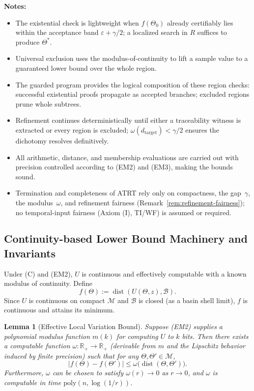 \documentclass[12pt]{article}
\theoremstyle{definition}
\theoremstyle{plain}
\newtheorem{lemma}{Lemma}[section]
\begin{document}
\textbf{Notes:}
\begin{itemize}[itemsep=1pt]
  \item The existential check is lightweight when \(f(\Theta_0)\) already certifiably lies within the acceptance band \(\varepsilon + \gamma/2\); a localized search in \(R\) suffices to produce \(\Theta^*\).  
  \item Universal exclusion uses the modulus-of-continuity to lift a sample value to a guaranteed lower bound over the whole region.  
    \item The guarded program provides the logical composition of these region checks: successful existential proofs propagate as accepted branches; excluded regions prune whole subtrees.  
  \item Refinement continues deterministically until either a traceability witness is extracted or every region is excluded; \(\omega(d_{\mathrm{target}})<\gamma/2\) ensures the dichotomy resolves definitively.  
  \item All arithmetic, distance, and membership evaluations are carried out with precision controlled according to (EM2) and (EM3), making the bounds sound.  
  \item Termination and completeness of ATRT rely only on compactness, the gap~$\gamma$, the modulus~$\omega$, and refinement fairness (Remark~\ref{rem:refinement-fairness}); no temporal-input fairness (Axiom (I), TI/WF) is assumed or required.

\end{itemize}


\subsection{Continuity-based Lower Bound Machinery and Invariants}

Under (C) and (EM2), \(U\) is continuous and effectively computable with a known modulus of continuity. Define
\[
f(\Theta) := \operatorname{dist}(U(\Theta,z), \mathcal B).
\]
Since \(U\) is continuous on compact \(\mathcal M\) and \(\mathcal B\) is closed (as a basin shell limit), \(f\) is continuous and attains its minimum.

\begin{lemma}[Effective Local Variation Bound]
\label{lem:modulus-bound}
Suppose (EM2) supplies a polynomial modulus function \(m(k)\) for computing \(U\) to \(k\) bits. Then there exists a computable function \(\omega: \mathbb R_{+}\to\mathbb R_{+}\) (derivable from \(m\) and the Lipschitz behavior induced by finite precision) such that for any \(\Theta,\Theta'\in\mathcal M\),
\[
|f(\Theta)-f(\Theta')| \le \omega\bigl(\operatorname{dist}(\Theta,\Theta')\bigr).
\]
Furthermore, \(\omega\) can be chosen to satisfy \(\omega(r)\to 0\) as \(r\to 0\), and \(\omega\) is computable in time \(\mathrm{poly}(n,\log(1/r))\).
\end{lemma}
\end{document}
